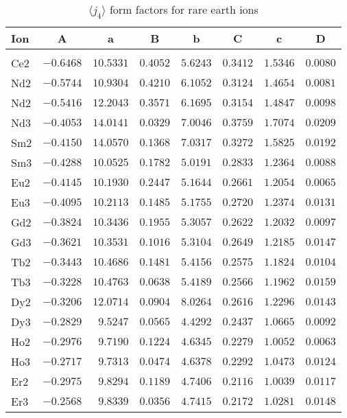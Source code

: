 \begin{table}[H]
\caption{$\langle j_4\rangle$ form factors for rare earth ions}\vspace{2mm}
\label{rej4}
{\tablesize
\begin{tabular}{lrrrrrrr}
\hline
Ion&
\multicolumn{1}{c}{A}&\multicolumn{1}{c}{a}&
\multicolumn{1}{c}{B}&\multicolumn{1}{c}{b}&
\multicolumn{1}{c}{C}&\multicolumn{1}{c}{c}&\multicolumn{1}{c}{D}\\
\hline\\[-2ex]
Ce2 &$-0.6468$ &$10.5331$ &$0.4052$ &$5.6243$ &$0.3412$ &$1.5346$ &$0.0080$ \\
Nd2 &$-0.5744$ &$10.9304$ &$0.4210$ &$6.1052$ &$0.3124$ &$1.4654$ &$0.0081$ \\
Nd2 &$-0.5416$ &$12.2043$ &$0.3571$ &$6.1695$ &$0.3154$ &$1.4847$ &$0.0098$ \\
Nd3 &$-0.4053$ &$14.0141$ &$0.0329$ &$7.0046$ &$0.3759$ &$1.7074$ &$0.0209$ \\
Sm2 &$-0.4150$ &$14.0570$ &$0.1368$ &$7.0317$ &$0.3272$ &$1.5825$ &$0.0192$ \\
Sm3 &$-0.4288$ &$10.0525$ &$0.1782$ &$5.0191$ &$0.2833$ &$1.2364$ &$0.0088$ \\
Eu2 &$-0.4145$ &$10.1930$ &$0.2447$ &$5.1644$ &$0.2661$ &$1.2054$ &$0.0065$ \\
Eu3 &$-0.4095$ &$10.2113$ &$0.1485$ &$5.1755$ &$0.2720$ &$1.2374$ &$0.0131$ \\
Gd2 &$-0.3824$ &$10.3436$ &$0.1955$ &$5.3057$ &$0.2622$ &$1.2032$ &$0.0097$ \\
Gd3 &$-0.3621$ &$10.3531$ &$0.1016$ &$5.3104$ &$0.2649$ &$1.2185$ &$0.0147$ \\
Tb2 &$-0.3443$ &$10.4686$ &$0.1481$ &$5.4156$ &$0.2575$ &$1.1824$ &$0.0104$ \\
Tb3 &$-0.3228$ &$10.4763$ &$0.0638$ &$5.4189$ &$0.2566$ &$1.1962$ &$0.0159$ \\
Dy2 &$-0.3206$ &$12.0714$ &$0.0904$ &$8.0264$ &$0.2616$ &$1.2296$ &$0.0143$ \\
Dy3 &$-0.2829$ &$9.5247$ &$0.0565$ &$4.4292$ &$0.2437$ &$1.0665$ &$0.0092$ \\
Ho2 &$-0.2976$ &$9.7190$ &$0.1224$ &$4.6345$ &$0.2279$ &$1.0052$ &$0.0063$ \\
Ho3 &$-0.2717$ &$9.7313$ &$0.0474$ &$4.6378$ &$0.2292$ &$1.0473$ &$0.0124$ \\
Er2 &$-0.2975$ &$9.8294$ &$0.1189$ &$4.7406$ &$0.2116$ &$1.0039$ &$0.0117$ \\
Er3 &$-0.2568$ &$9.8339$ &$0.0356$ &$4.7415$ &$0.2172$ &$1.0281$ &$0.0148$ \\

\end{tabular}}
\end{table}
